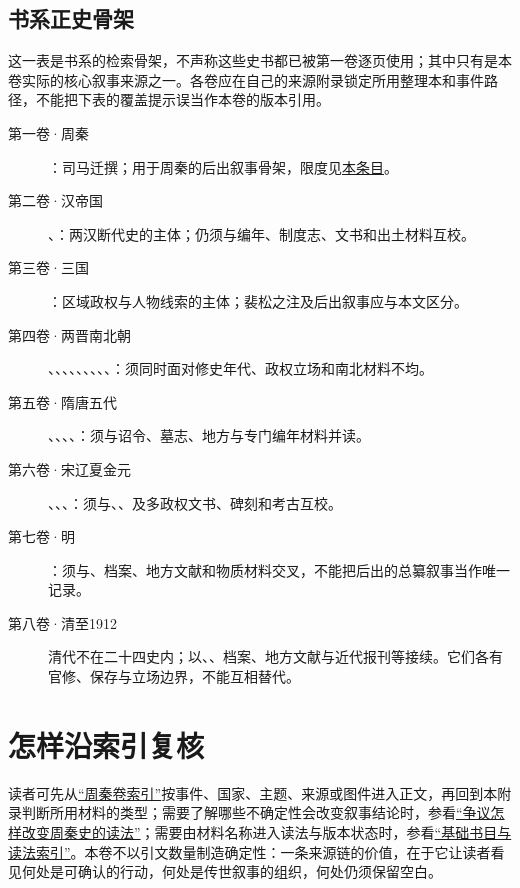 \subsection{书系正史骨架}

这一表是书系的检索骨架，不声称这些史书都已被第一卷逐页使用；其中只有是本卷实际的核心叙事来源之一。各卷应在自己的来源附录锁定所用整理本和事件路径，不能把下表的覆盖提示误当作本卷的版本引用。

\begin{description}
  \item[第一卷·周秦] ：司马迁撰；用于周秦的后出叙事骨架，限度见\hyperref[src:shiji]{本条目}。
  \item[第二卷·汉帝国] 、：两汉断代史的主体；仍须与编年、制度志、文书和出土材料互校。
  \item[第三卷·三国] ：区域政权与人物线索的主体；裴松之注及后出叙事应与本文区分。
  \item[第四卷·两晋南北朝] 、、、、、、、、、：须同时面对修史年代、政权立场和南北材料不均。
  \item[第五卷·隋唐五代] 、、、、：须与诏令、墓志、地方与专门编年材料并读。
  \item[第六卷·宋辽夏金元] 、、、：须与、、及多政权文书、碑刻和考古互校。
  \item[第七卷·明] ：须与、档案、地方文献和物质材料交叉，不能把后出的总纂叙事当作唯一记录。
  \item[第八卷·清至1912] 清代不在二十四史内；以、、档案、地方文献与近代报刊等接续。它们各有官修、保存与立场边界，不能互相替代。
\end{description}

\section{怎样沿索引复核}

读者可先从\hyperref[app:index]{“周秦卷索引”}按事件、国家、主题、来源或图件进入正文，再回到本附录判断所用材料的类型；需要了解哪些不确定性会改变叙事结论时，参看\hyperref[app:controversies]{“争议怎样改变周秦史的读法”}；需要由材料名称进入读法与版本状态时，参看\hyperref[app:bibliography]{“基础书目与读法索引”}。本卷不以引文数量制造确定性：一条来源链的价值，在于它让读者看见何处是可确认的行动，何处是传世叙事的组织，何处仍须保留空白。
